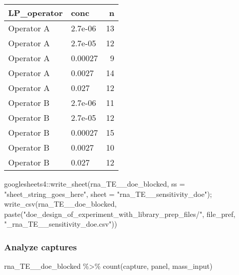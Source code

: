 \documentclass[
]{article}
\newenvironment{Shaded}{\begin{snugshade}}{\end{snugshade}}
\newcommand{\AttributeTok}[1]{\textcolor[rgb]{0.77,0.63,0.00}{#1}}
\newcommand{\FunctionTok}[1]{\textcolor[rgb]{0.00,0.00,0.00}{#1}}
\newcommand{\NormalTok}[1]{#1}
\newcommand{\SpecialCharTok}[1]{\textcolor[rgb]{0.00,0.00,0.00}{#1}}
\newcommand{\StringTok}[1]{\textcolor[rgb]{0.31,0.60,0.02}{#1}}
\begin{document}
\begin{longtable}[]{@{}llr@{}}
\toprule()
LP\_operator & conc & n \\
\midrule()
\endhead
Operator A & 2.7e-06 & 13 \\
Operator A & 2.7e-05 & 12 \\
Operator A & 0.00027 & 9 \\
Operator A & 0.0027 & 14 \\
Operator A & 0.027 & 12 \\
Operator B & 2.7e-06 & 11 \\
Operator B & 2.7e-05 & 12 \\
Operator B & 0.00027 & 15 \\
Operator B & 0.0027 & 10 \\
Operator B & 0.027 & 12 \\
\bottomrule()
\end{longtable}

\begin{Shaded}
\begin{Highlighting}[]
\NormalTok{googlesheets4}\SpecialCharTok{::}\FunctionTok{write\_sheet}\NormalTok{(rna\_TE\_\_doe\_blocked, }\AttributeTok{ss =} \StringTok{"sheet\_string\_goes\_here"}\NormalTok{,}
                           \AttributeTok{sheet =} \StringTok{"rna\_TE\_\_sensitivity\_doe"}\NormalTok{);}
\FunctionTok{write\_csv}\NormalTok{(rna\_TE\_\_doe\_blocked, }\FunctionTok{paste}\NormalTok{(}\StringTok{"doe\_design\_of\_experiment\_with\_library\_prep\_files/"}\NormalTok{,}
\NormalTok{                                           file\_pref,}
                                           \StringTok{"\_rna\_TE\_\_sensitivity\_doe.csv"}\NormalTok{))}
\end{Highlighting}
\end{Shaded}

\hypertarget{analyze-captures}{%
\subsubsection{Analyze captures}\label{analyze-captures}}

\begin{Shaded}
\begin{Highlighting}[]
\NormalTok{rna\_TE\_\_doe\_blocked }\SpecialCharTok{\%\textgreater{}\%}
  \FunctionTok{count}\NormalTok{(capture, panel, mass\_input)}
\end{Highlighting}
\end{Shaded}
\end{document}

